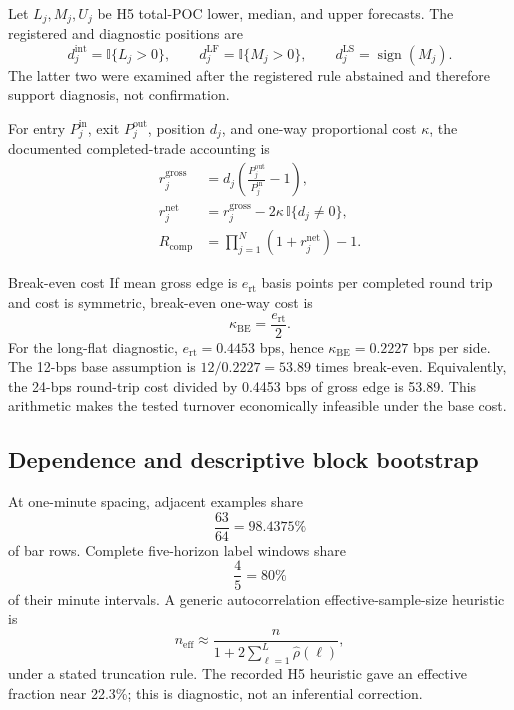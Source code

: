 \documentclass[10pt,letterpaper]{article}
\numberwithin{equation}{section}
\newcommand{\I}{\mathbb{I}}
\theoremstyle{definition}
\theoremstyle{remark}
\begin{document}
Let \(L_j,M_j,U_j\) be H5 total-POC lower, median, and upper forecasts. The
registered and diagnostic positions are
\begin{equation}
d_j^{\mathrm{int}}=\I\{L_j>0\},\qquad
d_j^{\mathrm{LF}}=\I\{M_j>0\},\qquad
d_j^{\mathrm{LS}}=\operatorname{sign}(M_j).
\label{eq:policies}
\end{equation}
The latter two were examined after the registered rule abstained and therefore
support diagnosis, not confirmation.

For entry \(P_j^{\mathrm{in}}\), exit \(P_j^{\mathrm{out}}\), position \(d_j\),
and one-way proportional cost \(\kappa\), the documented completed-trade
accounting is
\begin{align}
r_j^{\mathrm{gross}}
&=d_j\left(\frac{P_j^{\mathrm{out}}}{P_j^{\mathrm{in}}}-1\right),\nonumber\\
r_j^{\mathrm{net}}
&=r_j^{\mathrm{gross}}-2\kappa\,\I\{d_j\neq0\},\nonumber\\
R_{\mathrm{comp}}
&=\prod_{j=1}^{N}(1+r_j^{\mathrm{net}})-1.
\label{eq:return-accounting}
\end{align}

\begin{derivationbox}{Break-even cost}
If mean gross edge is \(e_{\mathrm{rt}}\) basis points per completed round
trip and cost is symmetric, break-even one-way cost is
\begin{equation}
\kappa_{\mathrm{BE}}=\frac{e_{\mathrm{rt}}}{2}.
\label{eq:break-even}
\end{equation}
For the long-flat diagnostic, \(e_{\mathrm{rt}}=0.4453\) bps, hence
\(\kappa_{\mathrm{BE}}=0.2227\) bps per side. The 12-bps base assumption is
\(12/0.2227=53.89\) times break-even. Equivalently, the 24-bps round-trip cost
divided by 0.4453 bps of gross edge is 53.89. This arithmetic makes the tested
turnover economically infeasible under the base cost.
\end{derivationbox}

\subsection{Dependence and descriptive block bootstrap}

At one-minute spacing, adjacent examples share
\begin{equation}
\frac{63}{64}=98.4375\%
\label{eq:bar-overlap}
\end{equation}
of bar rows. Complete five-horizon label windows share
\begin{equation}
\frac{4}{5}=80\%
\label{eq:label-overlap}
\end{equation}
of their minute intervals. A generic autocorrelation effective-sample-size
heuristic is
\begin{equation}
n_{\mathrm{eff}}
\approx\frac{n}{1+2\sum_{\ell=1}^{L}\widehat\rho(\ell)},
\label{eq:effective-n}
\end{equation}
under a stated truncation rule. The recorded H5 heuristic gave an effective
fraction near 22.3\%; this is diagnostic, not an inferential correction.
\end{document}
